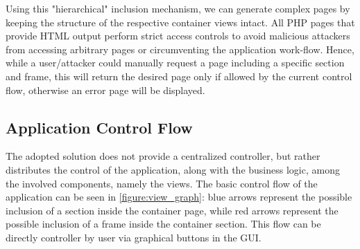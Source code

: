 Using this "hierarchical" inclusion mechanism, we can generate complex pages by keeping the structure of the respective container views intact.
All PHP pages that provide HTML output perform strict access controls to avoid malicious attackers from accessing arbitrary pages or circumventing the application work-flow. Hence, while a user/attacker could manually request a page including a specific section and frame, this will return the desired page only if allowed by the current control flow, otherwise an error page will be displayed.

\subsection{Application Control Flow}
The adopted solution does not provide a centralized controller, but rather distributes the control of the application, along with the business logic, among the involved components, namely the views. The basic control flow of the application can be seen in \autoref{figure:view_graph}: blue arrows represent the possible inclusion of a section inside the container page, while red arrows represent the possible inclusion of a frame inside the container section. This flow can be directly controller by user via graphical buttons in the GUI.

